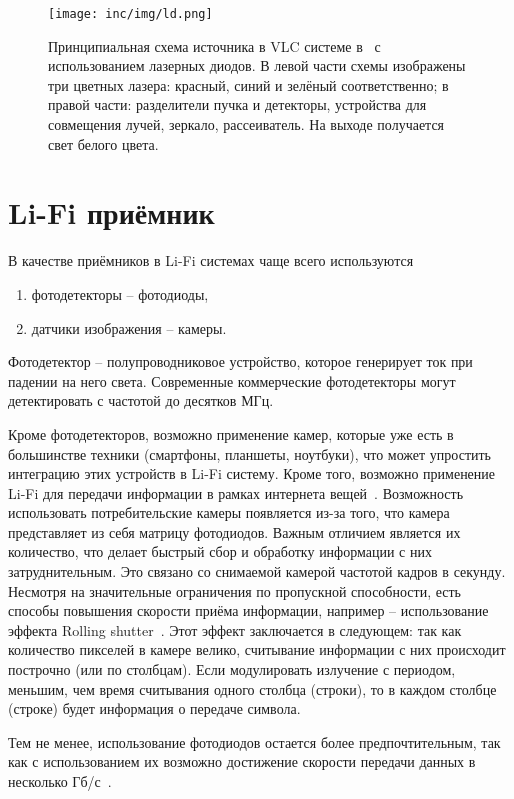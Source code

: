 \begin{figure}[!ht]
    \centering
    \texttt{[image: inc/img/ld.png]}
    \caption{Принципиальная схема источника в VLC системе в~\cite{Hussein2015} с использованием лазерных диодов. В левой части схемы изображены три цветных лазера: красный, синий и зелёный соответственно; в правой части: разделители пучка и детекторы, устройства для совмещения лучей, зеркало, рассеиватель. На выходе получается свет белого цвета.}
    \label{fig:ld}
\end{figure}

\section{Li-Fi приёмник}

В качестве приёмников в Li-Fi системах чаще всего используются

\begin{enumerate}
    \item фотодетекторы \--- фотодиоды,
    \item датчики изображения \--- камеры.
\end{enumerate}

Фотодетектор \--- полупроводниковое устройство, которое генерирует ток при падении на него света. Современные коммерческие фотодетекторы могут детектировать с частотой до десятков МГц. 


Кроме фотодетекторов, возможно применение камер, которые уже есть в большинстве техники (смартфоны, планшеты, ноутбуки), что может упростить интеграцию этих устройств в Li-Fi систему. Кроме того, возможно применение Li-Fi для передачи информации в рамках интернета вещей~\cite{Duquel2018}. Возможность использовать потребительские камеры появляется из-за того, что камера представляет из себя матрицу фотодиодов. Важным отличием является их количество, что делает быстрый сбор и обработку информации с них затруднительным. Это связано со снимаемой камерой частотой кадров в секунду. Несмотря на значительные ограничения по пропускной способности, есть способы повышения скорости приёма информации, например \--- использование эффекта Rolling shutter~\cite{TRAN2018}. Этот эффект заключается в следующем: так как количество пикселей в камере велико, считывание информации с них происходит построчно (или по столбцам). Если модулировать излучение с периодом, меньшим, чем время считывания одного столбца (строки), то в каждом столбце (строке) будет информация о передаче символа.

Тем не менее, использование фотодиодов остается более предпочтительным, так как с использованием их возможно достижение скорости передачи данных в несколько Гб/с~\cite{Cossu2012}.


